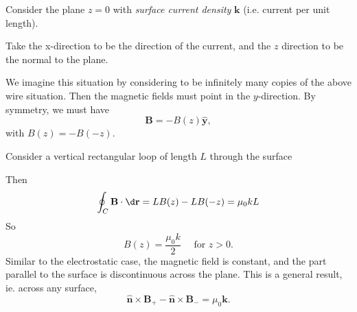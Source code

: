 \documentclass[a4paper]{article}
\begin{document}
\begin{eg}
  Consider the plane $z = 0$ with \emph{surface current density} $\mathbf{k}$ (i.e. current per unit length).
  \begin{center}
  \end{center}

  Take the x-direction to be the direction of the current, and the $z$ direction to be the normal to the plane.

  We imagine this situation by considering to be infinitely many copies of the above wire situation. Then the magnetic fields must point in the $y$-direction. By symmetry, we must have
  \[
    \mathbf{B} = -B(z) \hat{\mathbf{y}},
  \]
  with $B(z) = -B(-z)$.

  Consider a vertical rectangular loop of length $L$ through the surface
  \begin{center}
  \end{center}
  Then
  \[
    \oint_C \mathbf{B}\cdot \d \mathbf{r} = LB(z) - LB(-z) = \mu_0 kL
  \]
  So
  \[
    B(z) = \frac{\mu_0 k}{2}\quad\text{ for }z > 0.
  \]
  Similar to the electrostatic case, the magnetic field is constant, and the part parallel to the surface is discontinuous across the plane. This is a general result, ie. across any surface,
  \[
    \hat {\mathbf{n}} \times \mathbf{B}_+ - \hat{\mathbf{n}}\times \mathbf{B}_{-} = \mu_0 \mathbf{k}.
  \]
\end{eg}
\end{document}
